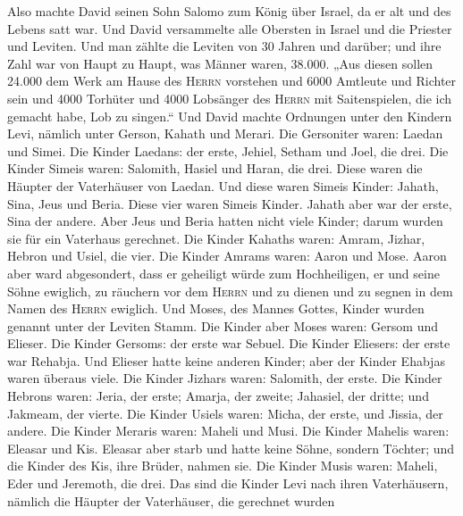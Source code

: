 Also machte David seinen Sohn Salomo zum König über
Israel, da er alt und des Lebens satt war.  Und David
versammelte alle Obersten in Israel und die Priester und Leviten.
 Und man zählte die Leviten von 30 Jahren und darüber; und
ihre Zahl war von Haupt zu Haupt, was Männer waren, 38.000.
 „Aus diesen sollen 24.000 dem Werk am Hause des
\textsc{Herrn} vorstehen und 6000 Amtleute und Richter sein
 und 4000 Torhüter und 4000 Lobsänger des \textsc{Herrn}
mit Saitenspielen, die ich gemacht habe, Lob zu singen.`` 
Und David machte Ordnungen unter den Kindern Levi, nämlich unter Gerson,
Kahath und Merari.  Die Gersoniter waren: Laedan und
Simei.  Die Kinder Laedans: der erste, Jehiel, Setham und
Joel, die drei.  Die Kinder Simeis waren: Salomith, Hasiel
und Haran, die drei. Diese waren die Häupter der Vaterhäuser von Laedan.
 Und diese waren Simeis Kinder: Jahath, Sina, Jeus und
Beria. Diese vier waren Simeis Kinder.  Jahath aber war
der erste, Sina der andere. Aber Jeus und Beria hatten nicht viele
Kinder; darum wurden sie für ein Vaterhaus gerechnet. 
Die Kinder Kahaths waren: Amram, Jizhar, Hebron und Usiel, die vier.
 Die Kinder Amrams waren: Aaron und Mose. Aaron aber ward
abgesondert, dass er geheiligt würde zum Hochheiligen, er und seine
Söhne ewiglich, zu räuchern vor dem \textsc{Herrn} und zu dienen und zu
segnen in dem Namen des \textsc{Herrn} ewiglich.  Und
Moses, des Mannes Gottes, Kinder wurden genannt unter der Leviten Stamm.
 Die Kinder aber Moses waren: Gersom und Elieser.
 Die Kinder Gersoms: der erste war Sebuel.
 Die Kinder Eliesers: der erste war Rehabja. Und Elieser
hatte keine anderen Kinder; aber der Kinder Ehabjas waren überaus viele.
 Die Kinder Jizhars waren: Salomith, der erste.
 Die Kinder Hebrons waren: Jeria, der erste; Amarja, der
zweite; Jahasiel, der dritte; und Jakmeam, der vierte. 
Die Kinder Usiels waren: Micha, der erste, und Jissia, der andere.
 Die Kinder Meraris waren: Maheli und Musi. Die Kinder
Mahelis waren: Eleasar und Kis.  Eleasar aber starb und
hatte keine Söhne, sondern Töchter; und die Kinder des Kis, ihre Brüder,
nahmen sie.  Die Kinder Musis waren: Maheli, Eder und
Jeremoth, die drei.  Das sind die Kinder Levi nach ihren
Vaterhäusern, nämlich die Häupter der Vaterhäuser, die gerechnet wurden
